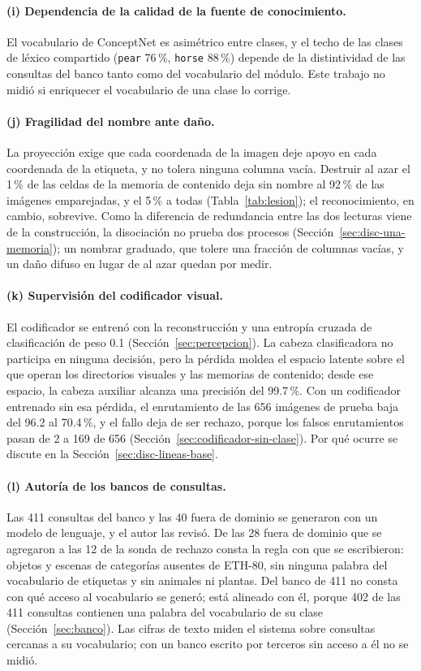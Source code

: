 \paragraph{(i) Dependencia de la calidad de la fuente de conocimiento.}
El vocabulario de ConceptNet es asimétrico entre clases, y el techo de las clases de
léxico compartido (\texttt{pear} 76\,\%, \texttt{horse} 88\,\%) depende de la
distintividad de las consultas del banco tanto como del vocabulario del módulo.
Este trabajo no midió si enriquecer el vocabulario de una clase lo corrige.

\paragraph{(j) Fragilidad del nombre ante daño.}
La proyección exige que cada coordenada de la imagen deje apoyo en cada coordenada de la
etiqueta, y no tolera ninguna columna vacía.
Destruir al azar el 1\,\% de las celdas de la memoria de contenido deja sin nombre al
92\,\% de las imágenes emparejadas, y el 5\,\% a todas
(Tabla~\ref{tab:lesion}); el reconocimiento, en cambio, sobrevive.
Como la diferencia de redundancia entre las dos lecturas viene de la construcción, la
disociación no prueba dos procesos (Sección~\ref{sec:disc-una-memoria}); un nombrar
graduado, que tolere una fracción de columnas vacías, y un daño difuso en lugar de al
azar quedan por medir.

\paragraph{(k) Supervisión del codificador visual.}
El codificador se entrenó con la reconstrucción y una entropía cruzada de clasificación
de peso 0.1 (Sección~\ref{sec:percepcion}).
La cabeza clasificadora no participa en ninguna decisión, pero la pérdida moldea el
espacio latente sobre el que operan los directorios visuales y las memorias de
contenido; desde ese espacio, la cabeza auxiliar alcanza una precisión del 99.7\,\%.
Con un codificador entrenado sin esa pérdida, el enrutamiento de las 656 imágenes de
prueba baja del 96.2 al 70.4\,\%, y el fallo deja de ser rechazo, porque los falsos
enrutamientos pasan de 2 a 169 de 656 (Sección~\ref{sec:codificador-sin-clase}).
Por qué ocurre se discute en la Sección~\ref{sec:disc-lineas-base}.

\paragraph{(l) Autoría de los bancos de consultas.}
Las 411 consultas del banco y las 40 fuera de dominio se generaron con un modelo de
lenguaje, y el autor las revisó.
De las 28 fuera de dominio que se agregaron a las 12 de la sonda de rechazo consta la
regla con que se escribieron: objetos y escenas de categorías ausentes de ETH-80, sin
ninguna palabra del vocabulario de etiquetas y sin animales ni plantas.
Del banco de 411 no consta con qué acceso al vocabulario se generó; está alineado con
él, porque 402 de las 411 consultas contienen una palabra del vocabulario de su clase
(Sección~\ref{sec:banco}).
Las cifras de texto miden el sistema sobre consultas cercanas a su vocabulario; con un
banco escrito por terceros sin acceso a él no se midió.

